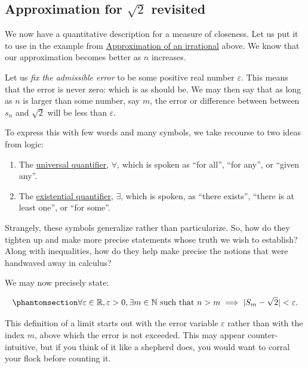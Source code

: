 \documentclass[
  a4paper,
]{article}
\begin{document}
\subsection{\texorpdfstring{Approximation for \(\sqrt{2}\)
revisited}{Approximation for \textbackslash sqrt\{2\} revisited}}\label{approximation-for-sqrt2-revisited}

We now have a quantitative description for a measure of closeness. Let
us put it to use in the example from
\hyperref[approximation-of-an-irrational]{Approximation of an
irrational} above. We know that our approximation becomes better as
\(n\) increases.

Let us \emph{fix the admissible error} to be some positive real number
\(\varepsilon\). This means that the error is never zero: which is as
should be. We may then say that as long as \(n\) is larger than some
number, say \(m\), the error or difference between between \(s_{n}\) and
\(\sqrt{2}\) will be less than \(\varepsilon\).

To express this with few words and many symbols, we take recourse to two
ideas from logic:

\begin{enumerate}
\def\labelenumi{\alph{enumi}.}
\item
  The
  \href{https://en.wikipedia.org/wiki/Universal_quantification}{universal
  quantifier}, \(\forall\), which is spoken as ``for all'', ``for any'',
  or ``given any''.
\item
  The
  \href{https://en.wikipedia.org/wiki/Existential_quantification}{existential
  quantifier}, \(\exists\), which is spoken, as ``there exists'',
  ``there is at least one'', or ``for some''.
\end{enumerate}

Strangely, these symbols generalize rather than particularize. So, how
do they tighten up and make more precise statements whose truth we wish
to establish? Along with inequalities, how do they help make precise the
notions that were handwaved away in calculus?

We may now precisely state:

\begin{equation}\phantomsection\label{eq:epsilon}{
\forall \varepsilon \in \mathbb{R}, \varepsilon > 0, \exists m \in \mathbb{N} \text{ such that } n > m \implies |S_{m} - \sqrt{2}| < \varepsilon.
}\end{equation}

This definition of a limit starts out with the error variable
\(\varepsilon\) rather than with the index \(m\), above which the error
is not exceeded. This may appear counter-intuitive, but if you think of
it like a shepherd does, you would want to corral your flock before
counting it.
\end{document}
